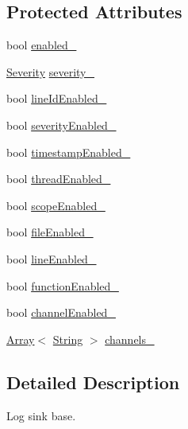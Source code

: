 \subsection*{Protected Attributes}
\begin{DoxyCompactItemize}
\item 
bool \hyperlink{classostk_1_1core_1_1logger_1_1sinks_1_1_sink_a36b5e1e2ef67889e3787920d792ee061}{enabled\+\_\+}
\item 
\hyperlink{namespaceostk_1_1core_1_1logger_a52d02954e094391f067befffe7f3cae9}{Severity} \hyperlink{classostk_1_1core_1_1logger_1_1sinks_1_1_sink_ab204e1f685dc9a208adbe06d5e0f6354}{severity\+\_\+}
\item 
bool \hyperlink{classostk_1_1core_1_1logger_1_1sinks_1_1_sink_a303e83d8ad7459122bae68e585163bf5}{line\+Id\+Enabled\+\_\+}
\item 
bool \hyperlink{classostk_1_1core_1_1logger_1_1sinks_1_1_sink_ae99e33f0e5f7d8df226464095f11cb5c}{severity\+Enabled\+\_\+}
\item 
bool \hyperlink{classostk_1_1core_1_1logger_1_1sinks_1_1_sink_ac18e9ae38b09bd049e900c6e7a5b5386}{timestamp\+Enabled\+\_\+}
\item 
bool \hyperlink{classostk_1_1core_1_1logger_1_1sinks_1_1_sink_a9c0c43f72f9bbc8276a64c6040696ff0}{thread\+Enabled\+\_\+}
\item 
bool \hyperlink{classostk_1_1core_1_1logger_1_1sinks_1_1_sink_ac4dc4261e28962fe1cdb41588d204099}{scope\+Enabled\+\_\+}
\item 
bool \hyperlink{classostk_1_1core_1_1logger_1_1sinks_1_1_sink_aba0425e9f715065b3e70da2a77b0819f}{file\+Enabled\+\_\+}
\item 
bool \hyperlink{classostk_1_1core_1_1logger_1_1sinks_1_1_sink_a7bd015ab0a98cd25eb8ada72ee342122}{line\+Enabled\+\_\+}
\item 
bool \hyperlink{classostk_1_1core_1_1logger_1_1sinks_1_1_sink_a59b6b95a6803713533da26d0b5c9f771}{function\+Enabled\+\_\+}
\item 
bool \hyperlink{classostk_1_1core_1_1logger_1_1sinks_1_1_sink_a7ce30490e1d1b9969ca9442483a26644}{channel\+Enabled\+\_\+}
\item 
\hyperlink{classostk_1_1core_1_1ctnr_1_1_array}{Array}$<$ \hyperlink{classostk_1_1core_1_1types_1_1_string}{String} $>$ \hyperlink{classostk_1_1core_1_1logger_1_1sinks_1_1_sink_a63c6b779d1dc982331aa9b388ab10313}{channels\+\_\+}
\end{DoxyCompactItemize}


\subsection{Detailed Description}
Log sink base. 

